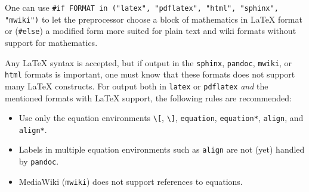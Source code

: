 \documentclass[%
oneside,                 %
final,                   %
10pt]{article}
\begin{document}
One can use \Verb!#if FORMAT in ("latex", "pdflatex", "html", "sphinx", "mwiki")!
to let the preprocessor choose a block of mathematics in {\LaTeX} format
or (\Verb!#else!) a modified form more suited for plain text and wiki
formats without support for mathematics.

Any {\LaTeX} syntax is accepted, but if output in the \Verb!sphinx!, \Verb!pandoc!,
\Verb!mwiki!, or \Verb!html! formats
is important, one must know that these formats does not support many
{\LaTeX} constructs. For output both in \Verb!latex! or \Verb!pdflatex! \emph{and}
the mentioned formats with {\LaTeX} support,
the following rules are recommended:

\begin{itemize}
  \item Use only the equation environments \Verb!\[!, \Verb!\]!,
    \Verb!equation!, \Verb!equation*!, \Verb!align!, and \Verb!align*!.

  \item Labels in multiple equation environments such as \Verb!align! are
    not (yet) handled by \Verb!pandoc!.

  \item MediaWiki (\Verb!mwiki!) does not support references to equations.
\end{itemize}

\noindent

\setlength{\fboxrule}{2pt}
\begin{center}
\end{center}
\setlength{\fboxrule}{0.4pt} %
\end{document}
